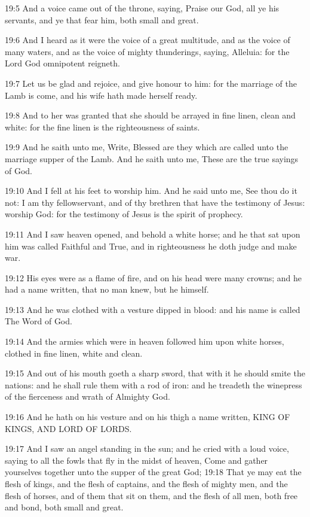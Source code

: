 19:5 And a voice came out of the throne, saying, Praise our God, all
ye his servants, and ye that fear him, both small and great.

19:6 And I heard as it were the voice of a great multitude, and as the
voice of many waters, and as the voice of mighty thunderings, saying,
Alleluia: for the Lord God omnipotent reigneth.

19:7 Let us be glad and rejoice, and give honour to him: for the
marriage of the Lamb is come, and his wife hath made herself ready.

19:8 And to her was granted that she should be arrayed in fine linen,
clean and white: for the fine linen is the righteousness of saints.

19:9 And he saith unto me, Write, Blessed are they which are called
unto the marriage supper of the Lamb. And he saith unto me, These are
the true sayings of God.

19:10 And I fell at his feet to worship him. And he said unto me, See
thou do it not: I am thy fellowservant, and of thy brethren that have
the testimony of Jesus: worship God: for the testimony of Jesus is the
spirit of prophecy.

19:11 And I saw heaven opened, and behold a white horse; and he that
sat upon him was called Faithful and True, and in righteousness he
doth judge and make war.

19:12 His eyes were as a flame of fire, and on his head were many
crowns; and he had a name written, that no man knew, but he himself.

19:13 And he was clothed with a vesture dipped in blood: and his name
is called The Word of God.

19:14 And the armies which were in heaven followed him upon white
horses, clothed in fine linen, white and clean.

19:15 And out of his mouth goeth a sharp sword, that with it he should
smite the nations: and he shall rule them with a rod of iron: and he
treadeth the winepress of the fierceness and wrath of Almighty God.

19:16 And he hath on his vesture and on his thigh a name written, KING
OF KINGS, AND LORD OF LORDS.

19:17 And I saw an angel standing in the sun; and he cried with a loud
voice, saying to all the fowls that fly in the midst of heaven, Come
and gather yourselves together unto the supper of the great God; 19:18
That ye may eat the flesh of kings, and the flesh of captains, and the
flesh of mighty men, and the flesh of horses, and of them that sit on
them, and the flesh of all men, both free and bond, both small and
great.


